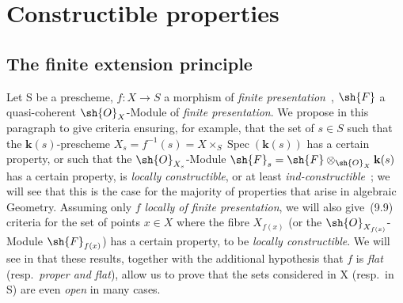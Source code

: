 \section{Constructible properties}
\label{section:IV.9}

\subsection{The finite extension principle}
\label{subsection:IV.9.1}

Let S be a prescheme, $f:X\to S$ a morphism of \emph{finite presentation}~,
$\sh{F}$ a quasi-coherent $\sh{O}_X$-Module of \emph{finite presentation}.
We propose in this paragraph to give criteria ensuring, for example, that the set of $s\in S$ such that the $\mathbf{k}(s)$-prescheme $X_s=f^{-1}(s)=X\times_S\operatorname{Spec}(\mathbf{k}(s))$ has a certain property, or such that the $\sh{O}_{X_s}$-Module $\sh{F}_s=\sh{F}\otimes_{\sh{O}_X}\mathbf{k}(s)$ has a certain property, is \emph{locally constructible}, or at least \emph{ind-constructible}~; we will see that this is the case for the majority of properties that arise in algebraic Geometry.
Assuming only $f$ \emph{locally of finite presentation}, we will also give~(9.9) criteria for the set of points $x\in X$ where the fibre $X_{f(x)}$ (or the $\sh{O}_{X_{f(x)}}$-Module $\sh{F}_{f(x)}$) has a certain property, to be \emph{locally constructible}.
We will see in  that these results, together with the additional hypothesis that $f$ is \emph{flat} (resp.\ \emph{proper and flat}), allow us to prove that the sets considered in X (resp.\ in S) are even \emph{open} in many cases.



